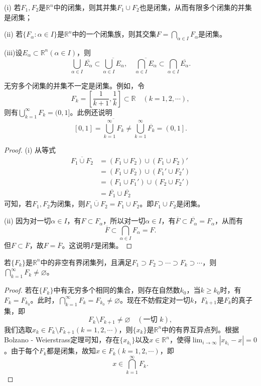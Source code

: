 \documentclass[../../main.tex]{subfiles}
\begin{document}
\begin{theorem}[闭集的运算性质]\label{theorem:闭集的运算性质}
  (i) 若\(F_1,F_2\)是\(\mathbb{R}^n\)中的闭集，则其并集\(F_1\cup F_2\)也是闭集，从而有限多个闭集的并集是闭集；

(ii) 若\(\{F_{\alpha}:\alpha\in I\}\)是\(\mathbb{R}^n\)中的一个闭集族，则其交集\(F = \bigcap_{\alpha\in I}F_{\alpha}\)是闭集。

(iii)设\(E_{\alpha}\subset\mathbb{R}^n(\alpha\in I)\)，则
\[\bigcup_{\alpha\in I}\overline{E_{\alpha}}\subset\overline{\bigcup_{\alpha\in I}E_{\alpha}},\quad\overline{\bigcap_{\alpha\in I}E_{\alpha}}\subset\bigcap_{\alpha\in I}\overline{E_{\alpha}}.\]
\end{theorem}
\begin{remark}
  无穷多个闭集的并集不一定是闭集。例如，令
\[F_k=\left[\frac{1}{k + 1},\frac{1}{k}\right]\subset\mathbb{R}\quad(k = 1,2,\cdots),\]
则有\(\bigcup_{k = 1}^{\infty}F_k=(0,1]\)。此例还说明
\[\left[ 0,1 \right] =\overline{\bigcup_{k=1}^{\infty}{F_k}}\ne \bigcup_{k=1}^{\infty}{\overline{F_k}}=\left( 0,1 \right] .\]
\end{remark}
\begin{proof}
  (i) 从等式
\begin{align*}
\overline{F_1\cup F_2}&=(F_1\cup F_2)\cup (F_1\cup F_2)'\\
&=(F_1\cup F_2)\cup (F_1'\cup F_2')\\
&=(F_1\cup F_1')\cup (F_2\cup F_2')\\
&=\overline{F_1}\cup\overline{F_2}
\end{align*}
可知，若\(F_1,F_2\)为闭集，则\(\overline{F_1\cup F_2}=F_1\cup F_2\)。即\(F_1\cup F_2\)是闭集。

(ii) 因为对一切\(\alpha\in I\)，有\(F\subset F_{\alpha}\)，所以对一切\(\alpha\in I\)，有\(\overline{F}\subset\overline{F_{\alpha}} = F_{\alpha}\)，从而有
\[\overline{F}\subset\bigcap_{\alpha\in I}F_{\alpha}=F.\]
但\(F\subset\overline{F}\)，故\(F=\overline{F}\)。这说明\(F\)是闭集。

\end{proof}

\begin{theorem}[Cantor闭集套定理]\label{theorem:Cantor闭集套定理}
若\(\{F_k\}\)是\(\mathbb{R}^n\)中的非空有界闭集列，且满足\(F_1\supset F_2\supset\cdots\supset F_k\supset\cdots\)，则\(\bigcap_{k = 1}^{\infty}F_k\neq\varnothing\)。
\end{theorem}
\begin{proof}
  若在\(\{F_k\}\)中有无穷多个相同的集合，则存在自然数\(k_0\)，当\(k\geqslant k_0\)时，有\(F_k = F_{k_0}\)。此时，\(\bigcap_{k = 1}^{\infty}F_k = F_{k_0}\neq\varnothing\)。现在不妨假定对一切\(k\)，\(F_{k + 1}\)是\(F_k\)的真子集，即
\[F_k\setminus F_{k + 1}\neq\varnothing\quad (\text{一切 }k),\]
我们选取\(x_k\in F_k\setminus F_{k + 1}(k = 1,2,\cdots)\)，则\(\{x_k\}\)是\(\mathbb{R}^n\)中的有界互异点列。根据Bolzano - Weierstrass定理可知，存在\(\{x_{k_i}\}\)以及\(x\in\mathbb{R}^n\)，使得\(\lim_{i\rightarrow\infty}|x_{k_i}-x| = 0\)。由于每个\(F_k\)都是闭集，故知\(x\in F_k(k = 1,2,\cdots)\)，即
\[x\in\bigcap_{k = 1}^{\infty}F_k.\]

\end{proof}
\end{document}
